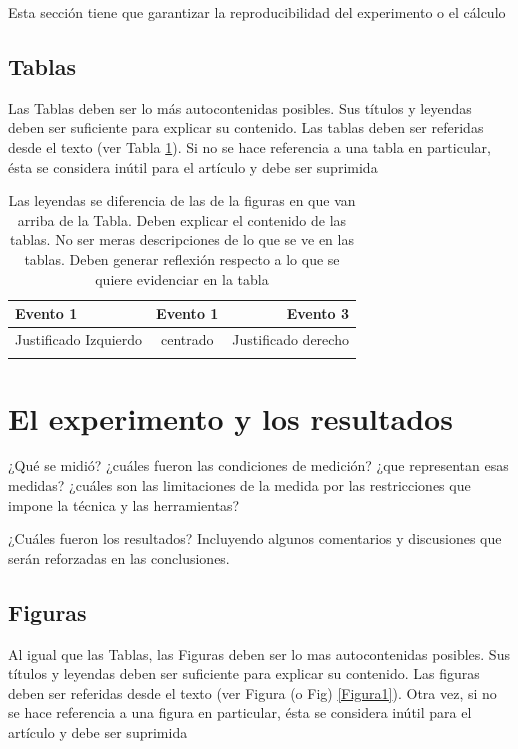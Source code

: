 \documentclass[spanish,notitlepage,letterpaper,11pt]{article} %
\begin{document}
Esta sección tiene que garantizar la reproducibilidad del experimento o el cálculo

\subsection{Tablas}
Las Tablas deben ser lo más autocontenidas posibles. Sus títulos y  leyendas deben ser suficiente para explicar su contenido. Las tablas deben ser referidas desde el texto (ver Tabla \ref{Tabla1}). Si no se hace referencia a una tabla en particular, ésta se considera inútil para el artículo y debe ser suprimida

\begin{table}[h!]
  \centering
  \caption{Las leyendas se diferencia de las de la figuras en que van arriba de la Tabla. Deben explicar el contenido de las tablas. No ser meras descripciones de lo que se ve en las tablas. Deben generar reflexión respecto a lo que se quiere evidenciar en la tabla}  
\begin{tabular}{l|c|r}
\hline
  Evento 1 & Evento 1  & Evento 3  \\ \hline
  Justificado Izquierdo & centrado & Justificado derecho \\ 
   &  &  \\ \hline \hline
\hline
\end{tabular}   
  \label{Tabla1}
\end{table}


\section{El experimento y los resultados}
¿Qué se midió? ¿cuáles fueron las condiciones de medición? ¿que representan esas medidas? ¿cuáles son las limitaciones de la medida por las restricciones que impone la técnica y las herramientas?

¿Cuáles fueron los resultados? Incluyendo algunos comentarios y discusiones que serán reforzadas en las conclusiones. 


\subsection{Figuras}
Al igual que las Tablas, las Figuras deben ser lo mas autocontenidas posibles. Sus títulos y  leyendas deben ser suficiente para explicar su contenido. Las figuras deben ser referidas desde el texto (ver Figura (o Fig) \ref{Figura1}). Otra vez, si no se hace referencia a una figura en particular, ésta se considera inútil para el artículo y debe ser suprimida
\end{document}
